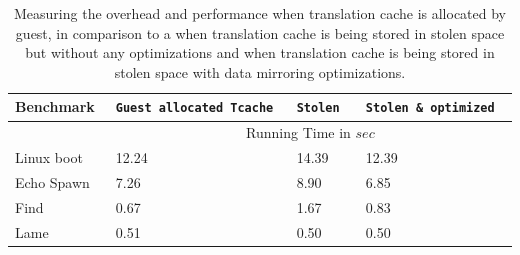 \begin{table}
\centering
      \begin{tabular}{|l| p{3.1cm} |p{3.1cm}|p{3.1cm}|} \hline
        Benchmark\verb, ,& {\tt Guest allocated Tcache} \verb, ,& {\tt Stolen} \verb, ,& {\tt Stolen \& optimized} \verb, , \\ \hline

     & \multicolumn{3}{c|}{Running Time in $sec$}\\ \cline {2-4}
Linux boot	&	12.24	&	14.39	&	12.39	\\
Echo Spawn	&	7.26	&	8.90	&	6.85	\\
Find	&	0.67	&	1.67	&	0.83	\\
Lame	&	0.51	&	0.50	&	0.50	\\
\hline
      \end{tabular}
\caption{\label{tab:tcache}Measuring the overhead and performance when translation cache is allocated by guest, in comparison to a when translation cache is being stored in stolen space but without any optimizations and when translation cache is being stored in stolen space with data mirroring optimizations.}
\end{table}







